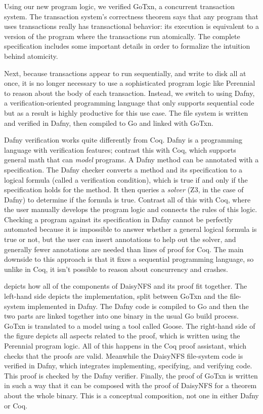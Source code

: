 Using our new program logic, we verified GoTxn, a concurrent transaction system.
The transaction system's correctness theorem says that any program that uses
transactions really has transactional behavior: its execution is equivalent to a
version of the program where the transactions run atomically. The complete
specification includes some important details in order to formalize the
intuition behind atomicity.

Next, because transactions appear to run sequentially, and write to disk all at
once, it is no longer necessary to use a sophisticated program logic like
Perennial to reason about the body of each transaction. Instead, we switch to
using Dafny, a verification-oriented programming language that only supports
sequential code but as a result is highly productive for this use case. The file
system is written and verified in Dafny, then compiled to Go and linked with
GoTxn.

Dafny verification works quite differently from Coq. Dafny is a programming
language with verification features; contrast this with Coq, which supports
general math that can \emph{model} programs. A Dafny method can be annotated
with a specification. The Dafny checker converts a method and its specification
to a logical formula (called a verification condition), which is true if and only if the specification holds for
the method. It then queries a \emph{solver} (Z3, in the case of Dafny) to determine if the formula is true.
Contrast all of this with Coq, where the user manually develops the program
logic and connects the rules of this logic. Checking a program against its specification in Dafny cannot be perfectly
automated because it is impossible to answer whether a general logical formula
is true or not, but the user can insert annotations to help out the solver, and
generally fewer annotations are needed than lines of proof for Coq. The main
downside to this approach is that it fixes a sequential programming language, so
unlike in Coq, it isn't possible to reason about concurrency and crashes.

 depicts how all of the components of DaisyNFS and its proof
fit together. The left-hand side depicts the implementation, split between GoTxn
and the file-system implemented in Dafny. The Dafny code is compiled to Go and
then the two parts are linked together into one  binary in the
usual Go build process. GoTxn is translated to a model using a tool called
Goose. The right-hand side of the figure depicts all aspects related to the
proof, which is written using the Perennial program logic. All of this happens
in the Coq proof assistant, which checks that the proofs are valid. Meanwhile
the DaisyNFS file-system code is verified in Dafny, which integrates
implementing, specifying, and verifying code. This proof is checked by the Dafny
verifier. Finally, the proof of GoTxn is written in such a way that it can be
composed with the proof of DaisyNFS for a theorem about the whole
 binary. This is a conceptual composition, not one in either
Dafny or Coq.

